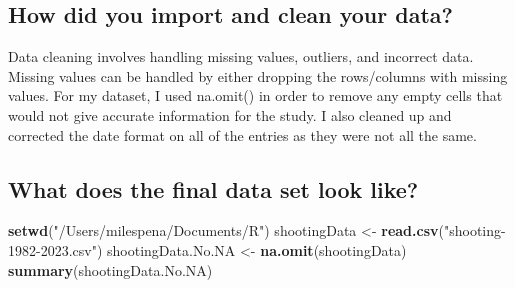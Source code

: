 \documentclass[
]{article}
\newenvironment{Shaded}{\begin{snugshade}}{\end{snugshade}}
\newcommand{\FunctionTok}[1]{\textcolor[rgb]{0.13,0.29,0.53}{\textbf{#1}}}
\newcommand{\NormalTok}[1]{#1}
\newcommand{\OtherTok}[1]{\textcolor[rgb]{0.56,0.35,0.01}{#1}}
\newcommand{\StringTok}[1]{\textcolor[rgb]{0.31,0.60,0.02}{#1}}
\begin{document}
\subsection{How did you import and clean your
data?}\label{how-did-you-import-and-clean-your-data}

Data cleaning involves handling missing values, outliers, and incorrect
data. Missing values can be handled by either dropping the rows/columns
with missing values. For my dataset, I used na.omit() in order to remove
any empty cells that would not give accurate information for the study.
I also cleaned up and corrected the date format on all of the entries as
they were not all the same.

\subsection{What does the final data set look
like?}\label{what-does-the-final-data-set-look-like}

\begin{Shaded}
\begin{Highlighting}[]
\FunctionTok{setwd}\NormalTok{(}\StringTok{"/Users/milespena/Documents/R"}\NormalTok{)}
\NormalTok{shootingData }\OtherTok{\textless{}{-}} \FunctionTok{read.csv}\NormalTok{(}\StringTok{"shooting{-}1982{-}2023.csv"}\NormalTok{)}
\NormalTok{shootingData.No.NA }\OtherTok{\textless{}{-}} \FunctionTok{na.omit}\NormalTok{(shootingData)}
\FunctionTok{summary}\NormalTok{(shootingData.No.NA)}
\end{Highlighting}
\end{Shaded}
\end{document}
